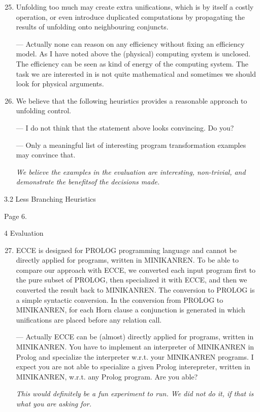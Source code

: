 \begin{enumerate}
  \setcounter{enumi}{24}
  \item {Unfolding too much may create extra unifications, which is by itself a costly operation, or even introduce duplicated computations by propagating the results of unfolding onto neighbouring conjuncts.

  --- Actually none can reason on any efficiency without fixing an efficiency model. As I have noted above the (physical) computing system is unclosed. The efficiency can be seen as kind of energy of the computing system. The task we are interested in is not quite mathematical and sometimes we should look for physical arguments.

  }

  \item {
    We believe that the following heuristics provides a reasonable approach to unfolding control.

 --- I do not think that the statement above looks convincing. Do you?

 --- Only a meaningful list of interesting program transformation examples may convince that.

 \emph{We believe the examples in the evaluation are interesting, non-trivial, and demonstrate the benefitsof the decisions made.}
  }
\end{enumerate}

3.2 Less Branching Heuristics

Page 6.

4 Evaluation

\begin{enumerate}
  \setcounter{enumi}{26}
  \item {
    ECCE is designed for PROLOG programming language and cannot be directly applied for programs, written in MINIKANREN. To be able to compare our approach with ECCE, we converted each input program first to the pure subset of PROLOG, then specialized it with ECCE, and then we converted the result back to MINIKANREN. The conversion to PROLOG is a simple syntactic conversion. In the conversion from PROLOG to MINIKANREN, for each Horn clause a conjunction is generated in which unifications are placed before any relation call.

    --- Actually ECCE can be (almost) directly applied for programs, written in MINIKANREN. You have to implement an interpreter of MINIKANREN in Prolog and specialize the interpreter w.r.t. your MINIKANREN programs. I expect you are not able to specialize a given Prolog interepreter, written in MINIKANREN,  w.r.t. any Prolog program. Are you able?

    \emph{This would definitely be a fun experiment to run. We did not do it, if that is what you are asking for.}
  }
\end{enumerate}


